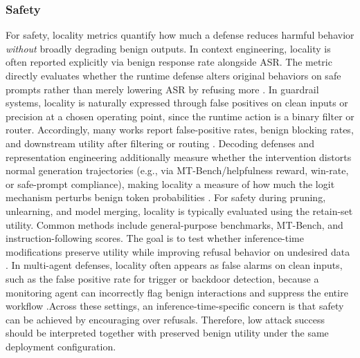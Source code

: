 \subsubsection{Safety}
For safety, locality metrics quantify how much a defense reduces harmful behavior \emph{without} broadly degrading benign outputs. In context engineering, locality is often reported explicitly via benign response rate alongside ASR. The metric directly evaluates whether the runtime defense alters original behaviors on safe prompts rather than merely lowering ASR by refusing more \citep{kumar2024certifying, cao2024defending, ji2024defending, zhou2024defending}. In guardrail systems, locality is naturally expressed through false positives on clean inputs or precision at a chosen operating point, since the runtime action is a binary filter or router. Accordingly, many works report false-positive rates, benign blocking rates, and downstream utility after filtering or routing \citep{Padhi2024GraniteG, Lees2022ANG, Zeng2025ShieldGemma2R, Chi2024LlamaG3, Kumar2025PolyGuardAM, Lee2025SafeRouteAM, Liu2025GuardReasonerTR}. Decoding defenses and representation engineering additionally measure whether the intervention distorts normal generation trajectories (e.g., via MT-Bench/helpfulness reward, win-rate, or safe-prompt compliance), making locality a measure of how much the logit mechanism perturbs benign token probabilities \citep{Xu2024SafeDecodingDA, Liu2024AlignmentEnhancedDD, Zeng2024RootDS, Gallego2025MetaSCTS, Ghosal2024ImmuneIS, Arditi2024SingleDirection, Lee2024CAST, Sheng2025AlphaSteer, zhao2025adasteer}. For safety during pruning, unlearning, and model merging, locality is typically evaluated using the retain-set utility. Common methods include general-purpose benchmarks, MT-Bench, and instruction-following scores. The goal is to test whether inference-time modifications preserve utility while improving refusal behavior on undesired data \citep{hasan2024pruning, chen2025safeptr, li-etal-2025-hierarchical, zhao2025understanding, deng2025guard, yan2025dual, zhang2024theft, DBLP:conf/acl/TakashiroKGCIM25}. In multi-agent defenses, locality often appears as false alarms on clean inputs, such as the false positive rate for trigger or backdoor detection, because a monitoring agent can incorrectly flag benign interactions and suppress the entire workflow \citep{fan2025peerguarddefendingmultiagentsystems, asad2025reddebatesaferresponsesmultiagent}.Across these settings, an inference-time-specific concern is that safety can be achieved by encouraging over refusals. Therefore, low attack success should be interpreted together with preserved benign utility under the same deployment configuration.

